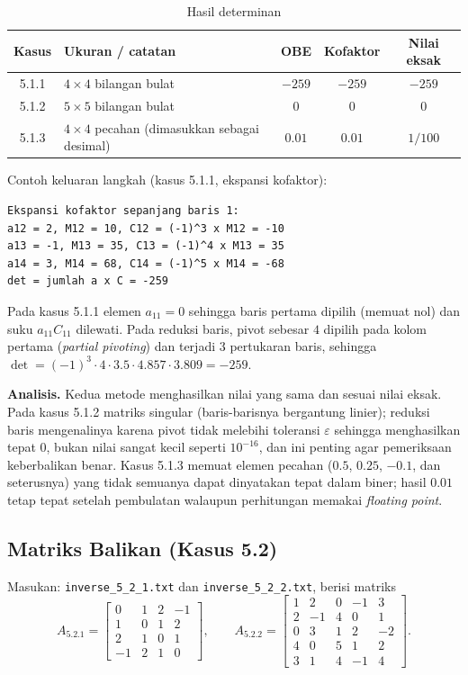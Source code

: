 \documentclass[12pt,a4paper]{article}
\begin{document}
\begin{table}[H]
\centering\small
\renewcommand{\arraystretch}{1.25}
\begin{tabular}{@{}clccc@{}}
\toprule
\textbf{Kasus} & \textbf{Ukuran / catatan} & \textbf{OBE} & \textbf{Kofaktor} & \textbf{Nilai eksak}\\
\midrule
5.1.1 & $4\times4$ bilangan bulat & $-259$ & $-259$ & $-259$\\
5.1.2 & $5\times5$ bilangan bulat & $0$ & $0$ & $0$\\
5.1.3 & $4\times4$ pecahan (dimasukkan sebagai desimal) & $0.01$ & $0.01$ & $1/100$\\
\bottomrule
\end{tabular}
\caption{Hasil determinan}
\end{table}

Contoh keluaran langkah (kasus 5.1.1, ekspansi kofaktor):
\begin{lstlisting}
Ekspansi kofaktor sepanjang baris 1:
a12 = 2, M12 = 10, C12 = (-1)^3 x M12 = -10
a13 = -1, M13 = 35, C13 = (-1)^4 x M13 = 35
a14 = 3, M14 = 68, C14 = (-1)^5 x M14 = -68
det = jumlah a x C = -259
\end{lstlisting}
Pada kasus 5.1.1 elemen $a_{11}=0$ sehingga baris pertama dipilih (memuat nol) dan suku $a_{11}C_{11}$ dilewati. Pada reduksi baris, pivot sebesar $4$ dipilih pada kolom pertama (\textit{partial pivoting}) dan terjadi 3 pertukaran baris, sehingga $\det=(-1)^3\cdot4\cdot3.5\cdot4.857\cdot3.809=-259$.

\textbf{Analisis.} Kedua metode menghasilkan nilai yang sama dan sesuai nilai eksak. Pada kasus 5.1.2 matriks singular (baris-barisnya bergantung linier); reduksi baris mengenalinya karena pivot tidak melebihi toleransi $\varepsilon$ sehingga menghasilkan tepat $0$, bukan nilai sangat kecil seperti $10^{-16}$, dan ini penting agar pemeriksaan keberbalikan benar. Kasus 5.1.3 memuat elemen pecahan ($0.5$, $0.25$, $-0.1$, dan seterusnya) yang tidak semuanya dapat dinyatakan tepat dalam biner; hasil $0.01$ tetap tepat setelah pembulatan walaupun perhitungan memakai \textit{floating point}.

\subsection{Matriks Balikan (Kasus 5.2)}
Masukan: \texttt{inverse\_5\_2\_1.txt} dan \texttt{inverse\_5\_2\_2.txt}, berisi matriks
\[
A_{5.2.1}=\begin{bmatrix}0&1&2&-1\\1&0&1&2\\2&1&0&1\\-1&2&1&0\end{bmatrix},\qquad
A_{5.2.2}=\begin{bmatrix}1&2&0&-1&3\\2&-1&4&0&1\\0&3&1&2&-2\\4&0&5&1&2\\3&1&4&-1&4\end{bmatrix}.
\]
\end{document}

